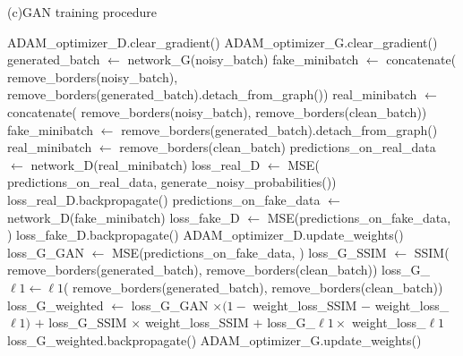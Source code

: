 \begin{algorithm}
\caption{(c)GAN training procedure}
\label{alg:gantrain}
\begin{algorithmic}[1]
\STATE ADAM\_optimizer\_D.clear\_gradient()
\STATE ADAM\_optimizer\_G.clear\_gradient()
\STATE {}
\STATE generated\_batch $\leftarrow$ network\_G(noisy\_batch)
\STATE {}
\STATE fake\_minibatch $\leftarrow$ concatenate(
\STATE \quad remove\_borders(noisy\_batch),
\STATE \quad remove\_borders(generated\_batch).detach\_from\_graph())
\STATE real\_minibatch $\leftarrow$ concatenate(
\STATE \quad remove\_borders(noisy\_batch),
\STATE \quad remove\_borders(clean\_batch))
\ELSE
\STATE fake\_minibatch $\leftarrow$ remove\_borders(generated\_batch).detach\_from\_graph()
\STATE real\_minibatch $\leftarrow$ remove\_borders(clean\_batch)
\ENDIF
\STATE predictions\_on\_real\_data $\leftarrow$ network\_D(real\_minibatch)
\STATE loss\_real\_D $\leftarrow$ \ac{MSE}(
\STATE \quad predictions\_on\_real\_data,
\STATE \quad generate\_noisy\_probabilities(\TRUE))
\STATE loss\_real\_D.backpropagate()
\STATE predictions\_on\_fake\_data $\leftarrow$ network\_D(fake\_minibatch)
\STATE loss\_fake\_D $\leftarrow$ \ac{MSE}(predictions\_on\_fake\_data, \FALSE)
\STATE loss\_fake\_D.backpropagate()
\STATE {}
\STATE ADAM\_optimizer\_D.update\_weights()
\ENDIF
\STATE {}
\STATE loss\_G\_GAN $\leftarrow$ \ac{MSE}(predictions\_on\_fake\_data, \TRUE)
\STATE loss\_G\_SSIM $\leftarrow$ \ac{SSIM}(
\STATE \quad remove\_borders(generated\_batch),
\STATE \quad remove\_borders(clean\_batch))
\STATE loss\_G\_$\ell 1\leftarrow \ell 1$(
\STATE \quad remove\_borders(generated\_batch),
\STATE \quad remove\_borders(clean\_batch))
\STATE loss\_G\_weighted $\leftarrow$ 
\STATE \quad loss\_G\_GAN $\times (1- $ weight\_loss\_SSIM $-$ weight\_loss\_$\ell 1)$
\STATE \quad $+$ loss\_G\_SSIM $\times$ weight\_loss\_SSIM
\STATE \quad $+$ loss\_G\_$\ell 1 \times$ weight\_loss\_$\ell 1$
\STATE loss\_G\_weighted.backpropagate()
\STATE ADAM\_optimizer\_G.update\_weights()
\ENDFOR
\end{algorithmic}
\end{algorithm}
